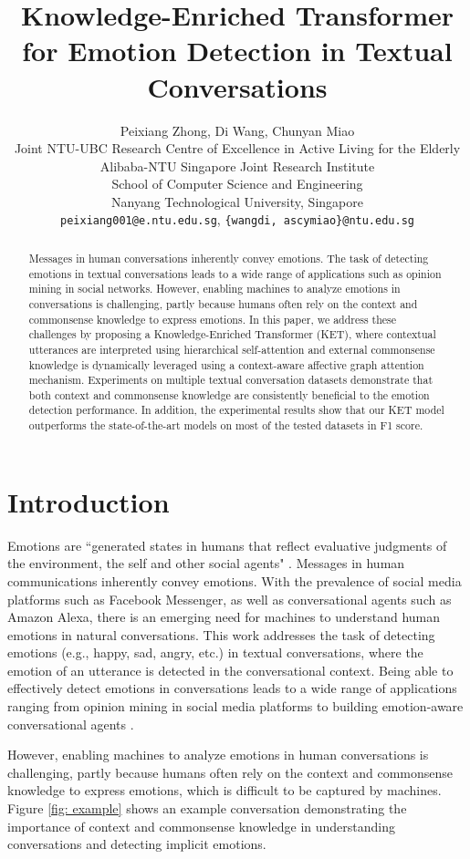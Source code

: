 \documentclass[11pt,a4paper]{article}
\title{Knowledge-Enriched Transformer for Emotion Detection in Textual Conversations}
\author{Peixiang Zhong, Di Wang, Chunyan Miao\\
Joint NTU-UBC Research Centre of Excellence in Active Living for the Elderly\\
Alibaba-NTU Singapore Joint Research Institute\\
School of Computer Science and Engineering\\
Nanyang Technological University, Singapore\\
\texttt{peixiang001@e.ntu.edu.sg}, \texttt{\{wangdi, ascymiao\}@ntu.edu.sg}
}
\date{}
\begin{document}
\maketitle
\begin{abstract}
Messages in human conversations inherently convey emotions. The task of detecting emotions in textual conversations leads to a wide range of applications such as opinion mining in social networks. However, enabling machines to analyze emotions in conversations is challenging, partly because humans often rely on the context and commonsense knowledge to express emotions. In this paper, we address these challenges by proposing a Knowledge-Enriched Transformer (KET), where contextual utterances are interpreted using hierarchical self-attention and external commonsense knowledge is dynamically leveraged using a context-aware affective graph attention mechanism. Experiments on multiple textual conversation datasets demonstrate that both context and commonsense knowledge are consistently beneficial to the emotion detection performance. In addition, the experimental results show that our KET model outperforms the state-of-the-art models on most of the tested datasets in F1 score.
\end{abstract}

\section{Introduction}
\label{introduction}

Emotions are ``generated states in humans that reflect evaluative judgments of the environment, the self and other social agents" \cite{hudlicka2011guidelines}. Messages in human communications inherently convey emotions. With the prevalence of social media platforms such as Facebook Messenger, as well as conversational agents such as Amazon Alexa, there is an emerging need for machines to understand human emotions in natural conversations. This work addresses the task of detecting emotions (e.g., happy, sad, angry, etc.) in textual conversations, where the emotion of an utterance is detected in the conversational context. Being able to effectively detect emotions in conversations leads to a wide range of applications ranging from opinion mining in social media platforms \cite{chatterjee2019understanding} to building emotion-aware conversational agents \cite{zhou2018emotional}. 

However, enabling machines to analyze emotions in human conversations is challenging, partly because humans often rely on the context and commonsense knowledge to express emotions, which is difficult to be captured by machines. Figure \ref{fig: example} shows an example conversation demonstrating the importance of context and commonsense knowledge in understanding conversations and detecting implicit emotions.
\end{document}
